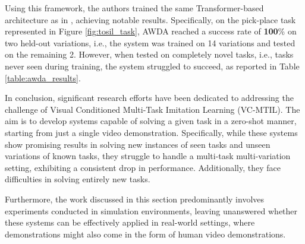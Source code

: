 Using this framework, the authors trained the same Transformer-based architecture as in \cite{dasari2021transformers_one_shot}, achieving notable results. Specifically, on the pick-place task represented in Figure \ref{fig:tosil_task}, AWDA reached a success rate of \textbf{100}\% on two held-out variations, i.e., the system was trained on 14 variations and tested on the remaining 2. However, when tested on completely novel tasks, i.e., tasks never seen during training, the system struggled to succeed, as reported in Table \ref{table:awda_results}.


In conclusion, significant research efforts have been dedicated to addressing the challenge of Visual Conditioned Multi-Task Imitation Learning (VC-MTIL). The aim is to develop systems capable of solving a given task in a zero-shot manner, starting from just a single video demonstration. Specifically, while these systems show promising results in solving new instances of seen tasks and unseen variations of known tasks, they struggle to handle a  multi-task multi-variation setting, exhibiting a consistent drop in performance. Additionally, they face difficulties in solving entirely new tasks.

Furthermore, the work discussed in this section predominantly involves experiments conducted in simulation environments, leaving unanswered whether these systems can be effectively applied in real-world settings, where demonstrations might also come in the form of human video demonstrations.

